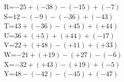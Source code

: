 \documentclass{article}%
\begin{document}
\vspace{0.35cm}%
R=$-25+(-38)-(-15)+(-7)$\\%
\vspace{0.35cm}%
S=$12-(-9)-(-36)+(-43)$\\%
\vspace{0.35cm}%
T=$43+(-36)-(+45)+(+44)$\\%
\vspace{0.35cm}%
U=$36+(+5)+(+44)+(-17)$\\%
\vspace{0.35cm}%
V=$22+(+48)-(+11)+(+33)$\\%
\vspace{0.35cm}%
W=$-21+(+19)-(+27)-(-6)$\\%
\vspace{0.35cm}%
X=$-32+(+43)-(+19)+(-5)$\\%
\vspace{0.35cm}%
Y=$48-(-42)-(-45)+(-47)$\\%
\vspace{0.35cm}

%
\newpage%
\end{document}
